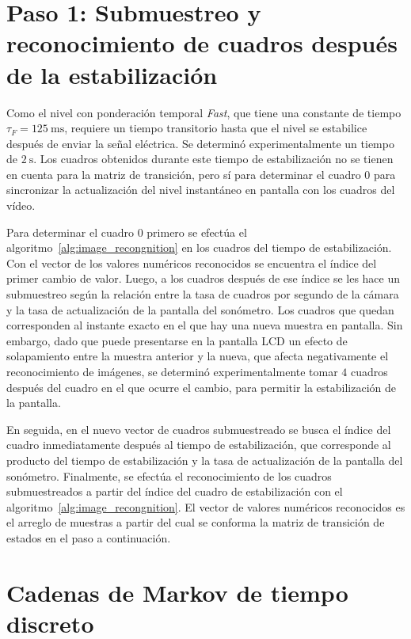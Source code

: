 \section*{Paso 1: Submuestreo y reconocimiento de cuadros después de la estabilización}
\label{sec:downsampling}
Como el nivel con ponderación temporal \emph{Fast}, que tiene una constante de tiempo $\tau_F = \qty{125}{\ms}$, requiere un tiempo transitorio hasta que el nivel se estabilice después de enviar la señal eléctrica.
Se determinó experimentalmente un tiempo de $\qty{2}{\s}$.
Los cuadros obtenidos durante este tiempo de estabilización no se tienen en cuenta para la matriz de transición, pero sí para determinar el cuadro $0$ para sincronizar la actualización del nivel instantáneo en pantalla con los cuadros del vídeo.

Para determinar el cuadro $0$ primero se efectúa el algoritmo~\ref{alg:image_recongnition} en los cuadros del tiempo de estabilización.
Con el vector de los valores numéricos reconocidos se encuentra el índice del primer cambio de valor.
Luego, a los cuadros después de ese índice se les hace un submuestreo según la relación entre la tasa de cuadros por segundo de la cámara y la tasa de actualización de la pantalla del sonómetro.
Los cuadros que quedan corresponden al instante exacto en el que hay una nueva muestra en pantalla.
Sin embargo, dado que puede presentarse en la pantalla LCD un efecto de solapamiento entre la muestra anterior y la nueva, que afecta negativamente el reconocimiento de imágenes, se determinó experimentalmente tomar $4$ cuadros después del cuadro en el que ocurre el cambio, para permitir la estabilización de la pantalla.

En seguida, en el nuevo vector de cuadros submuestreado se busca el índice del cuadro inmediatamente después al tiempo de estabilización, que corresponde al producto del tiempo de estabilización y la tasa de actualización de la pantalla del sonómetro.
Finalmente, se efectúa el reconocimiento de los cuadros submuestreados a partir del índice del cuadro de estabilización con el algoritmo~\ref{alg:image_recongnition}.
El vector de valores numéricos reconocidos es el arreglo de muestras a partir del cual se conforma la matriz de transición de estados en el paso a continuación.


\section*{Cadenas de Markov de tiempo discreto}

